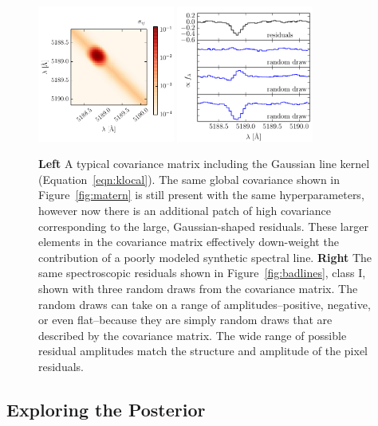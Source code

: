 \documentclass[iop,floatfix]{emulateapj}
\begin{document}
\begin{figure}[!htb]
\begin{center}
\includegraphics[width=0.4\textwidth]{figs/gauss_matrix.pdf}
\includegraphics[width=0.4\textwidth]{figs/gauss_draw.pdf}
\caption{\textbf{Left} A typical covariance matrix including the Gaussian line kernel (Equation~\ref{eqn:klocal}). The same global covariance shown in Figure~\ref{fig:matern} is still present with the same hyperparameters, however now there is an additional patch of high covariance corresponding to the large, Gaussian-shaped residuals. These larger elements in the covariance matrix effectively down-weight the contribution of a poorly modeled synthetic spectral line.
\textbf{Right} The same spectroscopic residuals shown in Figure~\ref{fig:badlines}, class I, shown with three random draws from the covariance matrix. The random draws can take on a range of amplitudes--positive, negative, or even flat--because they are simply random draws that are described by the covariance matrix. The wide range of possible residual amplitudes match the structure and amplitude of the pixel residuals.}
\label{fig:region}
\end{center}
\end{figure}

\subsection{Exploring the Posterior} \label{subsec:MCMC}
\end{document}
